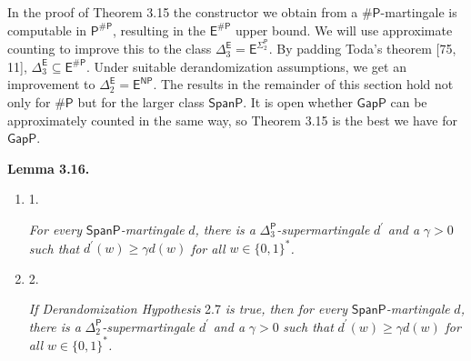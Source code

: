 \documentclass[10pt,a4paper]{article}
\begin{document}
In the proof of Theorem 3.15 the constructor we obtain from a ${\mathsf{\#}\mathsf{P}}$-martingale is computable in $\mathsf{P}^{\mathsf{\#}\mathsf{P}}$, resulting in the $\mathsf{E}^{\mathsf{\#}\mathsf{P}}$ upper bound. We will use approximate counting to improve this to the class $\Delta^{\mathsf{E}}_{3}=\mathsf{E}^{\Sigma^{\mathsf{P}}_{2}}$. By padding Toda’s theorem [75, 11], $\Delta^{\mathsf{E}}_{3}\subseteq\mathsf{E}^{\mathsf{\#}\mathsf{P}}$. Under suitable derandomization assumptions, we get an improvement to $\Delta^{\mathsf{E}}_{2}=\mathsf{E}^{\mathsf{NP}}$.
The results in the remainder of this section hold not only for ${\mathsf{\#}\mathsf{P}}$ but for the larger class $\mathsf{SpanP}$. It is open whether $\mathsf{GapP}$ can be approximately counted in the same way, so Theorem 3.15 is the best we have for $\mathsf{GapP}$.\par





\par\medskip\noindent\textbf{
\textbf{Lemma 3.16}\textbf{.}
}\par



\begin{enumerate}


\item[] 
1. 


\emph{For every }$\mathsf{SpanP}$\emph{-martingale }$d$\emph{, there is a }${\Delta^{\mathsf{P}}_{3}}$\emph{-supermartingale }$d^{\prime}$\emph{ and a }$\gamma>0$\emph{ such that }$d^{\prime}(w)\geq\gamma d(w)$\emph{ for all }$w\in\{0,1\}^{*}$\emph{.}\par





\item[] 
2. 


\emph{If Derandomization Hypothesis }2.7\emph{ is true, then for every }$\mathsf{SpanP}$\emph{-martingale }$d$\emph{, there is a }${\Delta^{\mathsf{P}}_{2}}$\emph{-supermartingale }$d^{\prime}$\emph{ and a }$\gamma>0$\emph{ such that }$d^{\prime}(w)\geq\gamma d(w)$\emph{ for all }$w\in\{0,1\}^{*}$\emph{.}\par





\end{enumerate}



\end{document}
